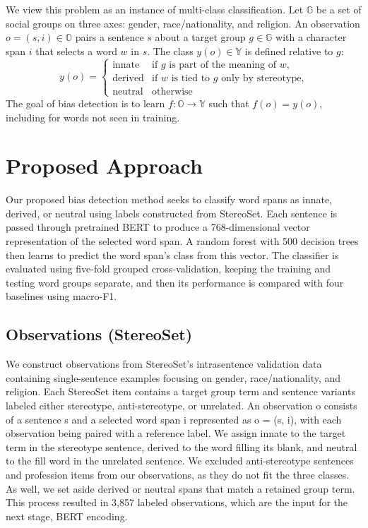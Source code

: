 \documentclass[sigconf]{acmart}
\begin{document}
We view this problem as an instance of multi-class classification. Let $\mathbb{G}$ be a set of social groups on three axes: gender, race/nationality, and religion. An observation $o = (s,i)\in \mathbb{O}$ pairs a sentence $s$ about a target group $g\in \mathbb{G}$ with a character span $i$ that selects a word $w$ in $s$. The class $y(o)\in \mathbb{Y}$ is defined relative to $g$:
\begin{equation}\label{label}
y(o)= \begin{cases}
    \text{innate} & \text{if } g \text{ is part of the meaning of } w,\\
    \text{derived} & \text{if } w \text{ is tied to } g \text{ only by stereotype,}\\
    \text{neutral} & \text{otherwise}
\end{cases}
\end{equation}
The goal of bias detection is to learn $f: \mathbb{O} \rightarrow \mathbb{Y}$ such that $f(o) = y(o)$, including for words not seen in training.

\section{Proposed Approach}\label{approach}
Our proposed bias detection method seeks to classify word spans as innate, derived, or neutral using labels constructed from StereoSet\cite{nadeem2020stereoset}. Each sentence is passed through pretrained BERT to produce a 768-dimensional vector representation of the selected word span. A random forest with 500 decision trees then learns to predict the word span's class from this vector. The classifier is evaluated using five-fold grouped cross-validation, keeping the training and testing word groups separate, and then its performance is compared with four baselines using macro-F1. 

\subsection{Observations (StereoSet)}
We construct observations from StereoSet's intrasentence validation data containing single-sentence examples focusing on gender, race/nationality, and religion. Each StereoSet item contains a target group term and sentence variants labeled either stereotype, anti-stereotype, or unrelated. An observation o consists of a sentence s and a selected word span i represented as o = (s, i), with each observation being paired with a reference label. We assign innate to the target term in the stereotype sentence, derived to the word filling its blank, and neutral to the fill word in the unrelated sentence. We excluded anti-stereotype sentences and profession items from our observations, as they do not fit the three classes. As well, we set aside derived or neutral spans that match a retained group term. This process resulted in 3,857 labeled observations, which are the input for the next stage, BERT encoding.
\end{document}
